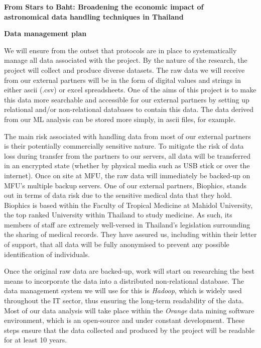\documentclass[11pt]{article}
\begin{document}
  \setcounter{figure}{0}
  \noindent
  {\LARGE \bf From Stars to Baht: Broadening the economic impact of \\
  astronomical data handling techniques in Thailand}
  
  \vspace{3mm}
  \noindent
  {\LARGE \bf Data management plan}
  
  \vspace{3mm}
  \noindent
  We will ensure from the outset that protocols are in place to systematically manage all data associated with the project. By the nature of the research, the project will collect and produce diverse datasets. The raw data we will receive from our external partners will be in the form of digital values and strings in either ascii (.csv) or excel spreadsheets. One of the aims of this project is to make this data more searchable and accessible for our external partners by setting up relational and/or non-relational databases to contain this data. The data derived from our ML analysis can be stored more simply, in ascii files, for example. 
  
  \vspace{2mm}
  \noindent
  The main risk associated with handling data from most of our external partners is their potentially commercially sensitive nature. To mitigate the risk of data loss during transfer from the partners to our servers, all data will be transferred in an encrypted state (whether by physical media such as USB stick or over the internet). Once on site at MFU, the raw data will immediately be backed-up on MFU's multiple backup servers. One of our external partners, Biophics, stands out in terms of data risk due to the sensitive medical data that they hold. Biophics is based within the Faculty of Tropical Medicine at Mahidol University, the top ranked University within Thailand to study medicine. As such, its members of staff are extremely well-versed in Thailand's legislation surrounding the sharing of medical records. They have assured us, including within their letter of support, that all data will be fully anonymised to prevent any possible identification of individuals. 
  
  \vspace{2mm}
  \noindent
  Once the original raw data are backed-up, work will start on researching the best means to incorporate the data into a distributed non-relational database. The data management system we will use for this is {\it Hadoop}, which is widely used throughout the IT sector, thus ensuring the long-term readability of the data. Most of our data analysis will take place within the {\it Orange} data mining software environment, which is an open-source and under constant development. These steps ensure that the data collected and produced by the project will be readable for at least 10 years. 
  
\end{document}
